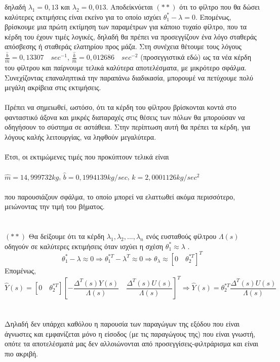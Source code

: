 \documentclass[12pt]{article}
\begin{document}
δηλαδή $\lambda_{1}=0,13$ και $\lambda_{2}=0,013$. Αποδείκνύεται $(**)$ ότι το φίλτρο που θα δώσει καλύτερες εκτιμήσεις είναι εκείνο για το οποίο ισχύει $\theta_{1}^{*}-\lambda=0$. Επομένως, βρίσκουμε μια πρώτη εκτίμηση των παραμέτρων για κάποιο τυχαίο φίλτρο, που τα κέρδη του έχουν τιμές λογικές, δηλαδή θα πρέπει να προσεγγίζουν ένα λόγο σταθεράς απόσβεσης ή σταθεράς ελατηρίου προς μάζα. Στη συνέχεια θέτουμε τους λόγους $\frac{\hat{b}}{\hat{m}} = 0,13307 \quad sec^{-1}$, $\frac{\hat{k}}{\hat{m}} = 0,012686 \quad sec^{-2}$ (προσεγγιστικά εδώ) ως τα νέα κέρδη του φίλτρου και παίρνουμε τελικά καλύτερα αποτελέσματα, με μικρότερο σφάλμα. Συνεχίζοντας επαναληπτικά την παραπάνω διαδικασία, μπορουμέ να πετύχουμε πολύ μεγάλη ακρίβεια στις εκτιμήσεις. \\ \\
Πρέπει να σημειωθεί, ωστόσο, ότι τα κέρδη του φίλτρου βρίσκονται κοντά στο φανταστικό άξονα και μικρές διαταραχές στις θέσεις των πόλων θα μπορούσαν να οδηγήσουν το σύστημα σε αστάθεια. Στην περίπτωση αυτή θα πρέπει τα κέρδη, για λόγους καλής λειτουργίας, να ληφθούν μεγαλύτερα.\\ \\
Έτσι, οι εκτιμώμενες τιμές που προκύπτουν τελικά είναι 
\\ \\
$\hat{m} =  14,999732 kg$, $\hat{b} =  0,1994139 kg/sec$, $\hat{k} = 2,0001126 kg/sec^2$
\\ \\
που παρουσιάζουν σφάλμα, το οποίο μπορεί να ελαττωθεί ακόμα περισσότερο, μειώνοντας την τιμή του βήματος.
\\ \\ \\
$(**)$ Θα δείξουμε ότι τα κέρδη $\lambda_{1},\lambda_{2},...,\lambda_{n}$ ενός ευσταθούς φίλτρου $\Lambda(s)$ οδηγούν σε καλύτερες εκτιμήσεις όταν ισχύει η σχέση $\theta_{1}^{*} \approx \lambda$ .
\\
\[ \theta_{1}^{*} - \lambda  \approx 0 \Rightarrow \theta_{1}^{*T}-\lambda^{T} \approx 0 \Rightarrow \theta_{\lambda} \approx [0 \quad \theta_{2}^{*T}]^{T} \]
Επομένως,
\[ \hat{Y}(s) = [0 \quad \theta_{2}^{*T}] \left[ -\frac{\Delta^{T}(s) Y(s)}{\Lambda(s)} \quad \frac{\Delta^{T}(s)U(s)}{\Lambda(s)} \right]^{T} \Rightarrow \hat{Y}(s) = \theta_{2}^{*T} \frac{\Delta^{T}(s)U(s)}{\Lambda(s)} \]
\\ \\
Δηλαδή δεν υπάρχει καθόλου η παρουσία των παραγώγων της εξόδου που είναι άγνωστες και εμφανίζεται μόνο η είσοδος (με τις παραγώγους της) που είναι γνωστή, οπότε τα αποτελέσματά μας δεν αλλοιώνονται από προσεγγίσεις-φιλτράρισμα και είναι πιο ακριβή.
\end{document}
